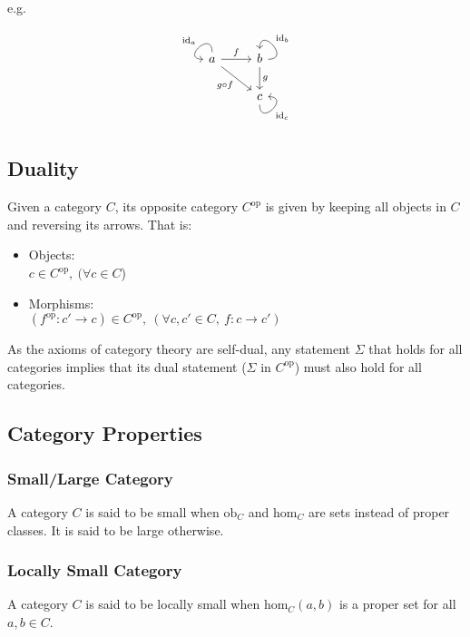e.g.
\[
  \begin{tikzcd}
    a
    \arrow[out=90, in=180, loop, swap, "\mathrm{id}_a", looseness=5]
    \arrow[r, "f"]
    \arrow[dr, swap, "g \circ f"]
    & b
    \arrow[out=0, in=90, loop, swap, "\mathrm{id}_b", looseness=4.5]
    \arrow[d,"g"]\\
    & c
    \arrow[out=-90, in=0, swap, "\mathrm{id}_c", looseness=5]
  \end{tikzcd}
\]

\subsection{Duality}
Given a category $C$, its opposite category $C^\mathrm{op}$ is given by keeping
all objects in $C$ and reversing its arrows. That is:
\parencite{maclane:working_mathematician}
\begin{itemize}
  \item Objects:\\
    $c\in C^\mathrm{op},\ (\forall c \in C$)
  \item Morphisms:\\
    $(f^\mathrm{op} : c' \to c)\in C^\mathrm{op},
      \ (\forall c, c' \in C,\ f : c \to c')$
\end{itemize}
As the axioms of category theory are self-dual, any statement $\Sigma$ that
holds for all categories implies that its dual statement ($\Sigma$ in
$C^\mathrm{op}$) must also hold for all categories.
\parencite{awodey:category_theory}

\subsection{Category Properties}

\subsubsection*{Small/Large Category}
A category $C$ is said to be small when $\mathrm{ob}_C$ and $\mathrm{hom}_C$ are
sets instead of proper classes. It is said to be large otherwise.
\parencite{awodey:category_theory}

\subsubsection*{Locally Small Category}
A category $C$ is said to be locally small when $\mathrm{hom}_C(a, b)$ is a
proper set for all $a,b\in C$. \parencite{awodey:category_theory}

